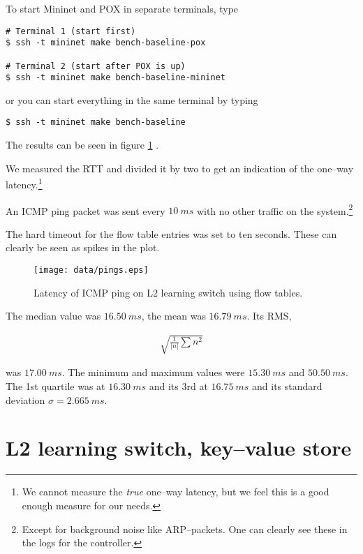 To start Mininet and POX in separate terminals, type
\begin{Verbatim}
# Terminal 1 (start first)
$ ssh -t mininet make bench-baseline-pox

# Terminal 2 (start after POX is up)
$ ssh -t mininet make bench-baseline-mininet
\end{Verbatim}
or you can start everything in the same terminal by typing
\begin{Verbatim}
$ ssh -t mininet make bench-baseline
\end{Verbatim}

The results can be seen in figure
\ref{benchmark:l2.learning.switch.ping}
.

We measured the \ac{RTT} and divided it by two to get an indication of the
one--way latency.\footnote{We cannot measure the \textit{true} one--way
latency, but we feel this is a good enough measure for our needs.}

An ICMP ping packet was sent every $10~ms$ with no other traffic on the
system.\footnote{Except for background noise like ARP--packets.  One can
clearly see these in the logs for the controller.}

The hard timeout for the flow table entries was set to ten seconds.  These
can clearly be seen as spikes in the plot.

\begin{figure}
  \centering
  \texttt{[image: data/pings.eps]}
  \caption{Latency of ICMP ping on L2 learning switch using flow tables.}
  \label{benchmark:l2.learning.switch.ping}
\end{figure}

The median value was $16.50~ms$, the mean was $16.79~ms$.
Its \ac{RMS},

\begin{gather}
  \sqrt{\frac{1}{|n]}\sum{n^2}}
  \label{equation:rms}
\end{gather}

was $17.00~ms$.
The minimum and maximum values were $15.30~ms$ and $50.50~ms$.
The 1st quartile was at $16.30~ms$ and its 3rd at $16.75~ms$ and its standard
deviation $\sigma = 2.665~ms$.


\section{L2 learning switch, key--value store}
\label{chapter:benchmark.l2.kv.noflows}

